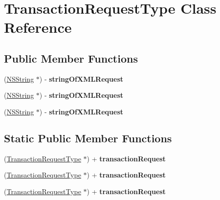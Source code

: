 \hypertarget{interface_transaction_request_type}{
\section{TransactionRequestType Class Reference}
\label{interface_transaction_request_type}
}
\subsection*{Public Member Functions}
\begin{DoxyCompactItemize}
\item 
\hypertarget{interface_transaction_request_type_a13f259e42fb3d79fdeec50328223a524}{
(\hyperlink{class_n_s_string}{NSString} $\ast$) -\/ {\bfseries stringOfXMLRequest}}
\label{interface_transaction_request_type_a13f259e42fb3d79fdeec50328223a524}

\item 
\hypertarget{interface_transaction_request_type_a13f259e42fb3d79fdeec50328223a524}{
(\hyperlink{class_n_s_string}{NSString} $\ast$) -\/ {\bfseries stringOfXMLRequest}}
\label{interface_transaction_request_type_a13f259e42fb3d79fdeec50328223a524}

\item 
\hypertarget{interface_transaction_request_type_a13f259e42fb3d79fdeec50328223a524}{
(\hyperlink{class_n_s_string}{NSString} $\ast$) -\/ {\bfseries stringOfXMLRequest}}
\label{interface_transaction_request_type_a13f259e42fb3d79fdeec50328223a524}

\end{DoxyCompactItemize}
\subsection*{Static Public Member Functions}
\begin{DoxyCompactItemize}
\item 
\hypertarget{interface_transaction_request_type_ad5f8002064df3580175ffe782d9511e7}{
(\hyperlink{interface_transaction_request_type}{TransactionRequestType} $\ast$) + {\bfseries transactionRequest}}
\label{interface_transaction_request_type_ad5f8002064df3580175ffe782d9511e7}

\item 
\hypertarget{interface_transaction_request_type_ad5f8002064df3580175ffe782d9511e7}{
(\hyperlink{interface_transaction_request_type}{TransactionRequestType} $\ast$) + {\bfseries transactionRequest}}
\label{interface_transaction_request_type_ad5f8002064df3580175ffe782d9511e7}

\item 
\hypertarget{interface_transaction_request_type_ad5f8002064df3580175ffe782d9511e7}{
(\hyperlink{interface_transaction_request_type}{TransactionRequestType} $\ast$) + {\bfseries transactionRequest}}
\label{interface_transaction_request_type_ad5f8002064df3580175ffe782d9511e7}

\end{DoxyCompactItemize}

